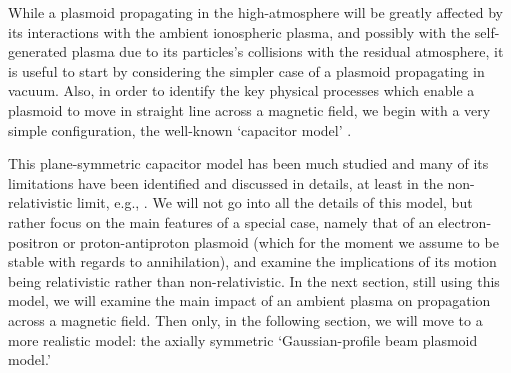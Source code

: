 \documentclass [12pt,a4paper,     ]{report} %
\begin{document}
While a plasmoid propagating in the high-atmosphere will be greatly affected by its interactions with the ambient ionospheric plasma, and possibly with the self-generated plasma due to its particles's collisions with the residual atmosphere, it is useful to start by considering the simpler case of a plasmoid propagating in vacuum.  Also, in order to identify the key physical processes which enable a plasmoid to move in straight line across a magnetic field, we begin with a very simple configuration, the well-known `capacitor model' \cite{SCHMI1960-, CHAPM1960-, DOLIQ1963-, SINEL1967-, PETER1982-, BOROV1987-, CAI-1992-}.

   This plane-symmetric capacitor model has been much studied and many of its limitations have been identified and discussed in details, at least in the non-relativistic limit, e.g., \cite{BOROV1987-}.   We will not go into all the details of this model, but rather focus on the main features of a special case, namely that of an electron-positron or proton-antiproton plasmoid (which for the moment we assume to be stable with regards to annihilation), and examine the implications of its motion being relativistic rather than non-relativistic.  In the next section, still using this model, we will examine the main impact of an ambient plasma on propagation across a magnetic field.  Then only, in the following section, we will move to a more realistic model: the axially symmetric `Gaussian-profile beam plasmoid model.'
\end{document}
